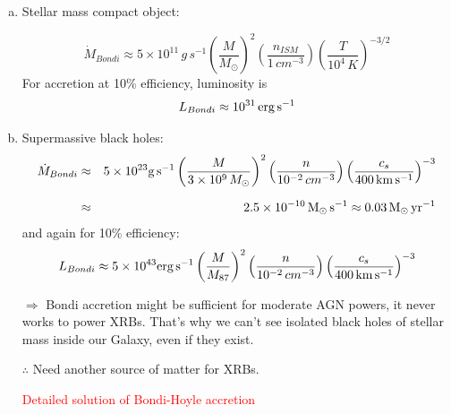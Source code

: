 \begin{enumerate}[a)]
   \item Stellar mass compact object: 

\begin{equation} 
   \dot{M}_{Bondi} \approx 5 \times 10^{11}\,g\,s^{-1} \left( \frac{M}{M_{\odot}} \right)^{2} \left( \frac{n_{ISM}}{1\,cm^{-3}} \right) \left( \frac{T}{10^{4}\,K} \right)^{-3/2}
\end{equation}
   For accretion at 10\% efficiency, luminosity is
\begin{equation}
   L_{Bondi} \approx 10^{31} \,{\rm erg\,s^{-1}}
\end{equation}

   \item Supermassive black holes:
\begin{eqnarray}
  \dot{M}_{Bondi} &\approx& 5\times10^{23} \unitmflux \left( \frac{M}{3 \times 10^{9}\,M_{\odot}} \right)^{2} 
                             \left( \frac{n}{10^{-2}\,cm^{-3}} \right) \left( \frac{c_{s}}{400\,\unitv} \right)^{-3} \nonumnext
                   &\approx& 2.5\times10^{-10} {\rm\,M_{\odot}\,s^{-1}} \approx 0.03\, \unitmfluxsol
\end{eqnarray}
   and again for 10\% efficiency:
\begin{equation}
   L_{Bondi} \approx 5\times10^{43} {\rm erg\,s^{-1}} \left( \frac{M}{M_{87}} \right)^{2}
                             \left( \frac{n}{10^{-2}\,cm^{-3}} \right) \left( \frac{c_{s}}{400\,{\rm km\,s^{-1}}} \right)^{-3}
\end{equation}

$\Rightarrow$ Bondi accretion might be sufficient for moderate AGN powers, it never works to
power XRBs. That's why we can't see isolated black holes of stellar mass inside our Galaxy, even if they exist.

$\therefore$ Need another source of matter for XRBs.

\textcolor{red}{Detailed solution of Bondi-Hoyle accretion }
\end{enumerate}


